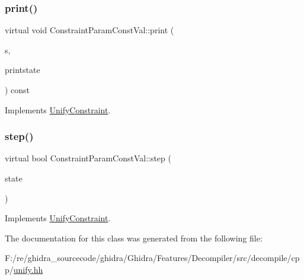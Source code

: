 \subsubsection{\texorpdfstring{print()}{print()}}
{\footnotesize\ttfamily virtual void Constraint\+Param\+Const\+Val\+::print (\begin{DoxyParamCaption}\item[{ostream \&}]{s,  }\item[{\mbox{\hyperlink{class_unify_c_printer}{Unify\+C\+Printer}} \&}]{printstate }\end{DoxyParamCaption}) const\hspace{0.3cm}{\ttfamily [virtual]}}



Implements \mbox{\hyperlink{class_unify_constraint_a774f6a611a96384766cb8e8d8f5ff41f}{Unify\+Constraint}}.

\mbox{\label{class_constraint_param_const_val_aab6146036d543edc207f16a75532f0b7}} 
\subsubsection{\texorpdfstring{step()}{step()}}
{\footnotesize\ttfamily virtual bool Constraint\+Param\+Const\+Val\+::step (\begin{DoxyParamCaption}\item[{\mbox{\hyperlink{class_unify_state}{Unify\+State}} \&}]{state }\end{DoxyParamCaption})\hspace{0.3cm}{\ttfamily [virtual]}}



Implements \mbox{\hyperlink{class_unify_constraint_ad9ab4ad91037f96bf803735d414d212d}{Unify\+Constraint}}.



The documentation for this class was generated from the following file\+:\begin{DoxyCompactItemize}
\item 
F\+:/re/ghidra\+\_\+sourcecode/ghidra/\+Ghidra/\+Features/\+Decompiler/src/decompile/cpp/\mbox{\hyperlink{unify_8hh}{unify.\+hh}}\end{DoxyCompactItemize}

